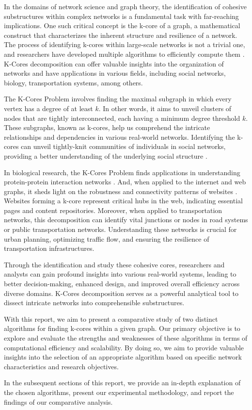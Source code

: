 \label{sec:Introduction}

In the domains of network science and graph theory, the identification of cohesive substructures within complex networks is a fundamental task with far-reaching implications. One such critical concept is the k-core of a graph, a mathematical construct that characterizes the inherent structure and resilience of a network. The process of identifying k-cores within large-scale networks is not a trivial one, and researchers have developed multiple algorithms to efficiently compute them \cite{9622845}. K-Cores decomposition can offer valuable insights into the organization of networks and have applications in various fields, including social networks, biology, transportation systems, among others.

The K-Cores Problem involves finding the maximal subgraph in which every vertex has a degree of at least \(k\). In other words, it aims to unveil clusters of nodes that are tightly interconnected, each having a minimum degree threshold \(k\). These subgraphs, known as k-cores, help us comprehend the intricate relationships and dependencies in various real-world networks. Identifying the k-cores can unveil tightly-knit communities of individuals in social networks, providing a better understanding of the underlying social structure \cite{dey2020network}.

In biological research, the K-Cores Problem finds applications in understanding protein-protein interaction networks \cite{Amin_2003}. And, when applied to the internet and web graphs, it sheds light on the robustness and connectivity patterns of websites \cite{Hamelin_2006}. Websites forming a k-core represent critical hubs in the web, indicating essential pages and content repositories.  Moreover, when applied to transportation networks, this decomposition can identify vital junctions or nodes in road systems or public transportation networks. Understanding these networks is crucial for urban planning, optimizing traffic flow, and ensuring the resilience of transportation infrastructures.

Through the identification and study these cohesive cores, researchers and analysts can gain profound insights into various real-world systems, leading to better decision-making, enhanced design, and improved overall efficiency across diverse domains. K-Cores decomposition serves as a powerful analytical tool to dissect intricate networks into comprehensible substructures. 

With this report, we aim to present a comparative study of two distinct algorithms for finding k-cores within a given graph. Our primary objective is to explore and evaluate the strengths and weaknesses of these algorithms in terms of computational efficiency and scalability. By doing so, we aim to provide valuable insights into the selection of an appropriate algorithm based on specific network characteristics and research objectives. 

In the subsequent sections of this report, we provide an in-depth explanation of the chosen algorithms, present our experimental methodology, and report the findings of our comparative analysis.